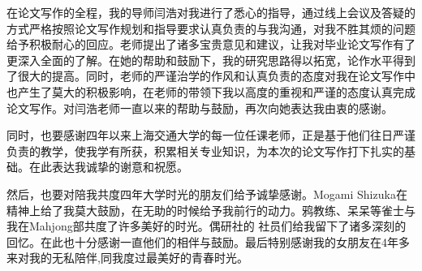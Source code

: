 
\begin{acknowledgements}
  在论文写作的全程，我的导师闫浩对我进行了悉心的指导，通过线上会议及答疑的方式严格按照论文写作规划和指导要求认真负责的与我沟通，对我不胜其烦的问题给予积极耐心的回应。老师提出了诸多宝贵意见和建议，让我对毕业论文写作有了更深入全面的了解。在她的帮助和鼓励下，我的研究思路得以拓宽，论作水平得到了很大的提高。同时，老师的严谨治学的作风和认真负责的态度对我在论文写作中也产生了莫大的积极影响，在老师的带领下我以高度的重视和严谨的态度认真完成论文写作。对闫浩老师一直以来的帮助与鼓励，再次向她表达我由衷的感谢。
  
  同时，也要感谢四年以来上海交通大学的每一位任课老师，正是基于他们往日严谨负责的教学，使我学有所获，积累相关专业知识，为本次的论文写作打下扎实的基础。在此表达我诚挚的谢意和祝愿。
  
  然后，也要对陪我共度四年大学时光的朋友们给予诚挚感谢。Mogami Shizuka在精神上给了我莫大鼓励，在无助的时候给予我前行的动力。鸦教练、呆呆等雀士与我在Mahjong部共度了许多美好的时光。偶研社的
  社员们给我留下了诸多深刻的回忆。在此也十分感谢一直他们的相伴与鼓励。最后特别感谢我的女朋友在4年多来对我的无私陪伴,同我度过最美好的青春时光。
  
\end{acknowledgements}
